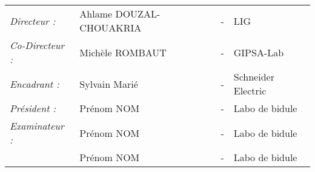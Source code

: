 \begin{titlepage}
\begin{center}
\begin{tabular}{llcl}
      \textit{Directeur :}	    & Ahlame DOUZAL-CHOUAKRIA & - & LIG\\
      \textit{Co-Directeur :}	& Michèle ROMBAUT	& - & GIPSA-Lab\\
      \textit{Encadrant :}	    & Sylvain Marié		& - & Schneider Electric\\
      \textit{Président :}	    & Prénom NOM		& - & Labo de bidule\\
      \textit{Examinateur :}    & Prénom NOM        & - & Labo de bidule\\
                                & Prénom NOM        & - & Labo de bidule\\
\end{tabular}
\end{center}
\end{titlepage}
\sloppy

\titlepage

